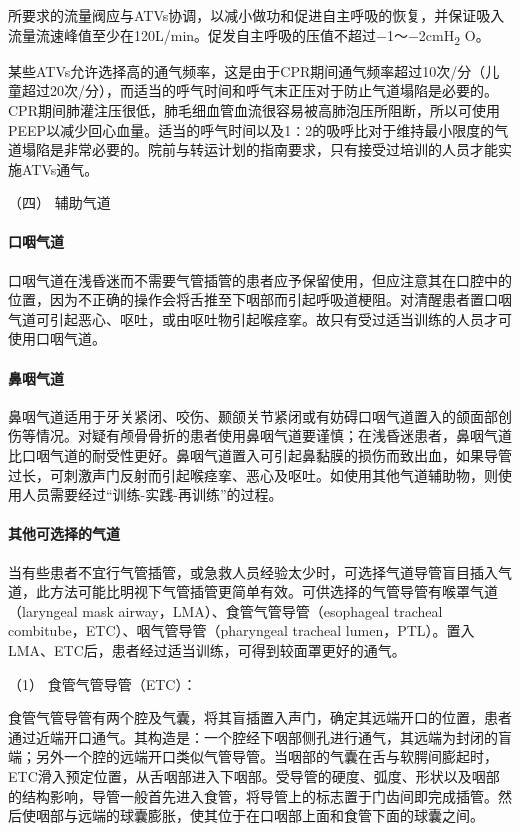 所要求的流量阀应与ATVs协调，以减小做功和促进自主呼吸的恢复，并保证吸入流量流速峰值至少在120L/min。促发自主呼吸的压值不超过−1～−2cmH\textsubscript{2}
O。

某些ATVs允许选择高的通气频率，这是由于CPR期间通气频率超过10次/分（儿童超过20次/分），而适当的呼气时间和呼气末正压对于防止气道塌陷是必要的。CPR期间肺灌注压很低，肺毛细血管血流很容易被高肺泡压所阻断，所以可使用PEEP以减少回心血量。适当的呼气时间以及1∶2的吸呼比对于维持最小限度的气道塌陷是非常必要的。院前与转运计划的指南要求，只有接受过培训的人员才能实施ATVs通气。

\hypertarget{text00284.htmlux5cux23CHP10-1-5-3-4}{}
（四） 辅助气道

\paragraph{口咽气道}

口咽气道在浅昏迷而不需要气管插管的患者应予保留使用，但应注意其在口腔中的位置，因为不正确的操作会将舌推至下咽部而引起呼吸道梗阻。对清醒患者置口咽气道可引起恶心、呕吐，或由呕吐物引起喉痉挛。故只有受过适当训练的人员才可使用口咽气道。

\paragraph{鼻咽气道}

鼻咽气道适用于牙关紧闭、咬伤、颞颌关节紧闭或有妨碍口咽气道置入的颌面部创伤等情况。对疑有颅骨骨折的患者使用鼻咽气道要谨慎；在浅昏迷患者，鼻咽气道比口咽气道的耐受性更好。鼻咽气道置入可引起鼻黏膜的损伤而致出血，如果导管过长，可刺激声门反射而引起喉痉挛、恶心及呕吐。如使用其他气道辅助物，则使用人员需要经过“训练-实践-再训练”的过程。

\paragraph{其他可选择的气道}

当有些患者不宜行气管插管，或急救人员经验太少时，可选择气道导管盲目插入气道，此方法可能比明视下气管插管更简单有效。可供选择的气管导管有喉罩气道（laryngeal
mask airway，LMA）、食管气管导管（esophageal tracheal
combitube，ETC）、咽气管导管（pharyngeal tracheal
lumen，PTL）。置入LMA、ETC后，患者经过适当训练，可得到较面罩更好的通气。

\hypertarget{text00284.htmlux5cux23CHP10-1-5-3-4-3-1}{}
（1） 食管气管导管（ETC）：

食管气管导管有两个腔及气囊，将其盲插置入声门，确定其远端开口的位置，患者通过近端开口通气。其构造是：一个腔经下咽部侧孔进行通气，其远端为封闭的盲端；另外一个腔的远端开口类似气管导管。当咽部的气囊在舌与软腭间膨起时，ETC滑入预定位置，从舌咽部进入下咽部。受导管的硬度、弧度、形状以及咽部的结构影响，导管一般首先进入食管，将导管上的标志置于门齿间即完成插管。然后使咽部与远端的球囊膨胀，使其位于在口咽部上面和食管下面的球囊之间。


